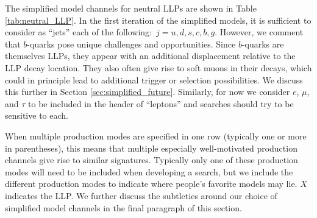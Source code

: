 The simplified model channels for neutral LLPs are shown in Table
\ref{tab:neutral_LLP}. In the first iteration of the simplified
models, it is sufficient to consider as ``jets'' each of the
following:~$j=u,d,s,c,b,g$. However, we comment that $b$-quarks pose
unique challenges and opportunities. Since $b$-quarks are themselves
LLPs, they appear with an additional displacement relative to the LLP
decay location. They also often give rise to soft muons in their
decays, which could in principle lead to additional trigger or
selection possibilities. We discuss this further in Section
\ref{sec:simplified_future}. Similarly, for now we consider $e$,
$\mu$, and $\tau$ to be included in the header of ``leptons'' and
searches should try to be sensitive to each.
 
When multiple production modes are specified in one row (typically one
or more in parentheses), this means that multiple especially
well-motivated production channels give rise to similar
signatures. Typically only one of these production modes will need to
be included when developing a search, but we include the different production modes
to indicate where people's favorite models may lie. $X$ indicates the
LLP. We further discuss the subtleties around our choice of simplified model channels in the final paragraph of this section.  
  


